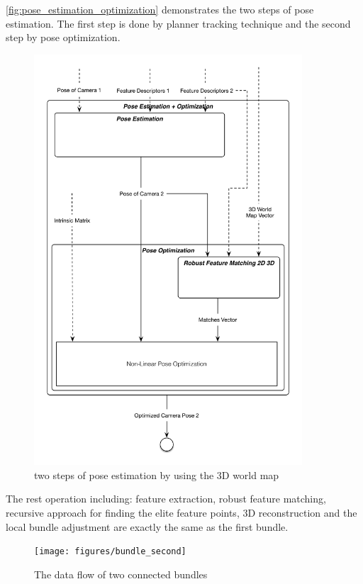 \autoref{fig:pose_estimation_optimization} demonstrates the two steps of pose estimation. The first step is done by planner tracking technique and the second step by pose optimization.

\begin{figure}[H]
  \centering
  \includegraphics[width=100mm]{figures/pose_estimation_optimization}
  \caption{two steps of pose estimation by using the 3D world map}\label{fig:pose_estimation_optimization}
\end{figure}

The rest operation including: feature extraction, robust feature matching, recursive approach for finding the elite feature points, 3D reconstruction and the local bundle adjustment are exactly the same as the first bundle. 

\begin{figure}[H]
  \centering
  \texttt{[image: figures/bundle\_second]}
  \caption{The data flow of two connected bundles}\label{fig:bundle_second}
\end{figure}

